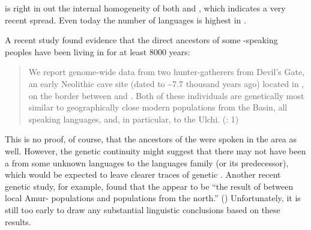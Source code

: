 \noindent \citet{Janhunen2005} is right in  out the internal homogeneity of both  and , which indicates a very recent spread. Even today the number of  languages is highest in .

A recent study found evidence that the direct ancestors of some -speaking peoples have been living in  for at least 8000 years:

\begin{quote}
We report genome-wide data from two hunter-gatherers from Devil’s Gate, an early Neolithic cave site (dated to {\textasciitilde}7.7 thousand years ago) located in , on the border between  and . Both of these individuals are genetically most similar to geographically close modern populations from the  Basin, all speaking  languages, and, in particular, to the Ulchi. (\citealt{Siska2017}: 1)
\end{quote}

\noindent This is no proof, of course, that the ancestors of the   were spoken in the area as well. However, the genetic continuity might suggest that there may not have been a  from some unknown languages to the  languages family (or its predecessor), which would be expected to leave clearer traces of genetic . Another recent genetic study, for example, found that the  appear to be “the result of  between local Amur- populations and  populations from the north.” (\citealt[1]{Duggan2013}) Unfortunately, it is still too early to draw any substantial linguistic conclusions based on these results.

